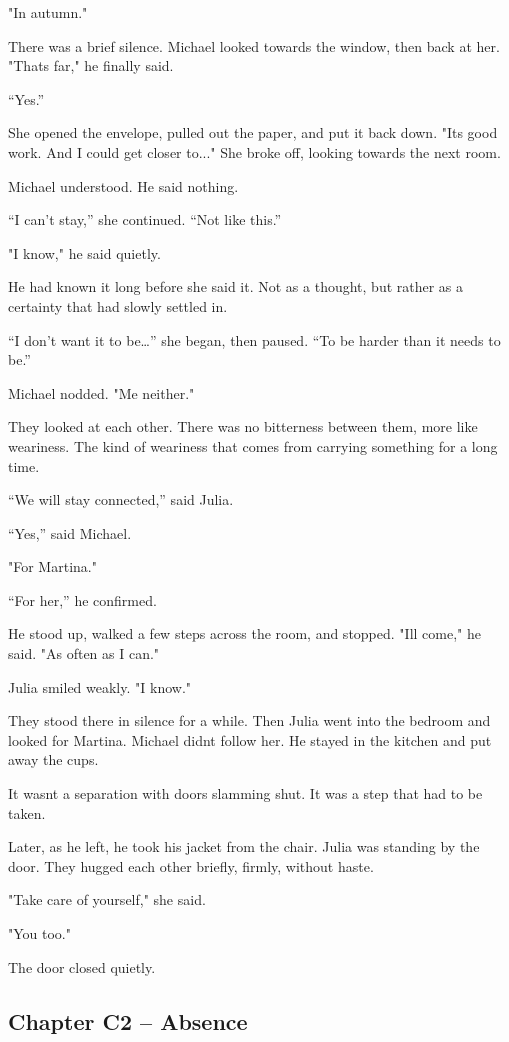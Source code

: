 \documentclass[
]{article}
\begin{document}
"In autumn."

There was a brief silence. Michael looked towards the window, then back at her. "That\textquotesingle s far," he finally said.

``Yes.''

She opened the envelope, pulled out the paper, and put it back down. "It\textquotesingle s good work. And I could get closer to..." She broke off, looking towards the next room.

Michael understood. He said nothing.

``I can't stay,'' she continued. ``Not like this.''

"I know," he said quietly.

He had known it long before she said it. Not as a thought, but rather as a certainty that had slowly settled in.

``I don't want it to be\ldots'' she began, then paused. ``To be harder than it needs to be.''

Michael nodded. "Me neither."

They looked at each other. There was no bitterness between them, more like weariness. The kind of weariness that comes from carrying something for a long time.

``We will stay connected,'' said Julia.

``Yes,'' said Michael.

"For Martina."

``For her,'' he confirmed.

He stood up, walked a few steps across the room, and stopped. "I\textquotesingle ll come," he said. "As often as I can."

Julia smiled weakly. "I know."

They stood there in silence for a while. Then Julia went into the bedroom and looked for Martina. Michael didn\textquotesingle t follow her. He stayed in the kitchen and put away the cups.

It wasn\textquotesingle t a separation with doors slamming shut. It was a step that had to be taken.

Later, as he left, he took his jacket from the chair. Julia was standing by the door. They hugged each other briefly, firmly, without haste.

"Take care of yourself," she said.

"You too."

The door closed quietly.

\subsection{Chapter C2 -- Absence}\label{chapter-c2-absence}
\end{document}
